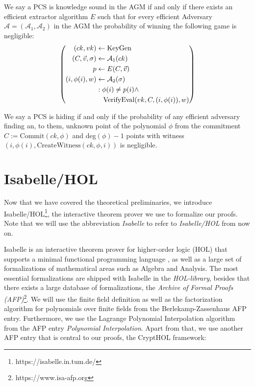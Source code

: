 \begin{definition}
    We say a PCS is knowledge sound in the AGM if and only if there exists an efficient extractor algorithm $E$ such that for every efficient Adversary $\mathcal{A}=(\mathcal{A}_1, \mathcal{A}_2)$ in the AGM the probability of winning the following game is negligible: 
    \begin{equation*}
        \left(
            \begin{aligned}
                (ck,vk) & \leftarrow \text{KeyGen} \\
                (C,\vec{v}, \sigma) & \leftarrow \mathcal{A}_1(ck)\\
                p & \leftarrow E(C,\vec{v}) \\
                (i, \phi(i), w) &\leftarrow \mathcal{A}_2(\sigma)\\
                & : \phi(i) \ne p(i) \land \\
                & \hspace{3.5mm} \text{VerifyEval}(vk, C,(i,\phi(i)),w)
            \end{aligned}
        \right)
    \end{equation*}
    \parencite{plonk}
\end{definition}

\begin{definition}[hiding]
    \label{hiding_def}
    We say a PCS is hiding if and only if the probability of any efficient adversary finding an, to them, unknown point of the polynomial $\phi$ from the commitment $C:=\text{Commit}(ck,\phi)$ and deg$(\phi)-1$ points with witness  $(i,\phi(i),\text{CreateWitness}(ck, \phi, i))$ is negligible.
    \parencite{KZG}
\end{definition}

\section{Isabelle/HOL}
Now that we have covered the theoretical preliminaries, we introduce Isabelle/HOL\footnote{https://isabelle.in.tum.de/}, the interactive theorem prover we use to formalize our proofs. 
Note that we will use the abbreviation \textit{Isabelle} to refer to \textit{Isabelle/HOL} from now on. 

Isabelle is an interactive theorem prover for higher-order logic (HOL) that supports a minimal functional programming language \parencite{isabelle_manual}, as well as a large set of formalizations of mathematical areas such as Algebra and Analysis. The most essential formalizations are shipped with Isabelle in the \textit{HOL-library}, besides that there exists a large database of formalizations, the \textit{Archive of Formal Proofs (AFP)}\footnote{https://www.isa-afp.org}. We will use the finite field definition as well as the factorization algorithm for polynomials over finite fields from the Berlekamp-Zassenhaus\parencite{Berlekamp_Zassenhaus-AFP} AFP entry. Furthermore, we use the Lagrange Polynomial Interpolation algorithm from the AFP entry \textit{Polynomial Interpolation}\parencite{Polynomial_Interpolation-AFP}.
Apart from that, we use another AFP entry that is central to our proofs, the CryptHOL framework\parencite{CryptHOL-AFP}:

